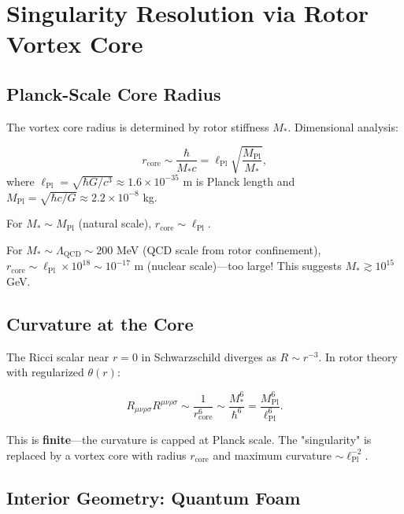 \documentclass[11pt,a4paper]{article}
\numberwithin{equation}{section}
\theoremstyle{plain}
\theoremstyle{definition}
\theoremstyle{remark}
\begin{document}
\section{Singularity Resolution via Rotor Vortex Core}
\label{sec:singularity}

\subsection{Planck-Scale Core Radius}

The vortex core radius is determined by rotor stiffness $M_*$. Dimensional analysis:

\begin{equation}
r_{\text{core}} \sim \frac{\hbar}{M_* c} = \ell_{\text{Pl}} \sqrt{\frac{M_{\text{Pl}}}{M_*}},
\label{eq:core-radius}
\end{equation}
where $\ell_{\text{Pl}} = \sqrt{\hbar G/c^3} \approx 1.6 \times 10^{-35}$ m is Planck length and $M_{\text{Pl}} = \sqrt{\hbar c/G} \approx 2.2 \times 10^{-8}$ kg.

For $M_* \sim M_{\text{Pl}}$ (natural scale), $r_{\text{core}} \sim \ell_{\text{Pl}}$.

For $M_* \sim \Lambda_{\text{QCD}} \sim 200$ MeV (QCD scale from rotor confinement), $r_{\text{core}} \sim \ell_{\text{Pl}} \times 10^{18} \sim 10^{-17}$ m (nuclear scale)—too large! This suggests $M_* \gtrsim 10^{15}$ GeV.

\subsection{Curvature at the Core}

The Ricci scalar near $r = 0$ in Schwarzschild diverges as $R \sim r^{-3}$. In rotor theory with regularized $\theta(r)$:

\begin{equation}
R_{\mu\nu\rho\sigma} R^{\mu\nu\rho\sigma} \sim \frac{1}{r_{\text{core}}^6} \sim \frac{M_*^6}{\hbar^6} = \frac{M_{\text{Pl}}^6}{\ell_{\text{Pl}}^6}.
\end{equation}

This is \textbf{finite}—the curvature is capped at Planck scale. The "singularity" is replaced by a vortex core with radius $r_{\text{core}}$ and maximum curvature $\sim \ell_{\text{Pl}}^{-2}$.

\subsection{Interior Geometry: Quantum Foam}
\end{document}
